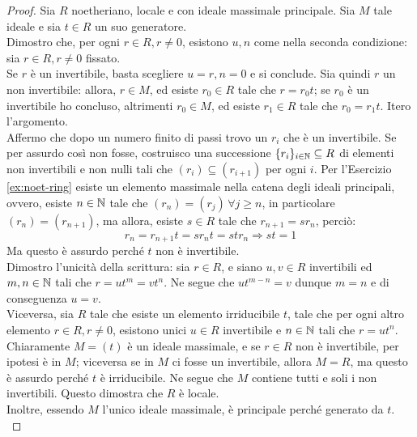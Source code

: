         \begin{proof}
            Sia $R$ noetheriano, locale e con ideale massimale principale. Sia $M$ tale ideale e sia $t \in R$ un suo generatore.\\
            Dimostro che, per ogni $r \in R, r \neq 0$, esistono $u,n$ come nella seconda condizione: sia $r \in R, r \neq 0$ fissato. \\
            Se $r$ è un invertibile, basta scegliere $u = r, n = 0$ e si conclude. Sia quindi $r$ un non invertibile: allora, $r \in M$, ed esiste $r_0 \in R$ 
            tale che $r = r_0t$; se $r_0$ è un invertibile ho concluso, altrimenti $r_0 \in M$, ed esiste $r_1 \in R$ tale che $r_0 = r_1t$. Itero l'argomento. \\
            Affermo che dopo un numero finito di passi trovo un $r_i$ che è un invertibile. Se per assurdo così non fosse, costruisco una successione 
            $\{r_i\}_{i \in \mathbb{N}} \subseteq R$ di elementi non invertibili e non nulli tali che $(r_i) \subseteq (r_{i+1})$ per ogni $i$. Per l'Esercizio \ref{ex:noet-ring} 
            esiste un elemento massimale nella catena degli ideali principali, ovvero, esiste $n \in \mathbb{N}$ tale che $(r_n) = (r_j) \, \forall j \geq n$, in particolare 
            $(r_n) = (r_{n+1})$, ma allora, esiste $s \in R$ tale che $r_{n+1} = sr_n$, perciò: \begin{equation*}
                r_n = r_{n+1}t = sr_nt = str_n \Longrightarrow st = 1
            \end{equation*}
            Ma questo è assurdo perché $t$ non è invertibile.\\
            Dimostro l'unicità della scrittura: sia $r \in R$, e siano $u,v \in R$ invertibili ed $m,n \in \mathbb{N}$ tali che $r = ut^m = vt^n$. Ne segue che $ut^{m-n} = v$ 
            dunque $m = n$ e di conseguenza $u = v$. \\
            Viceversa, sia $R$ tale che esiste un elemento irriducibile $t$, tale che per ogni altro elemento $r \in R, r \neq 0$, esistono unici $u \in R$ invertibile 
            e $n \in \mathbb{N}$ tali che $r = ut^n$. \\
            Chiaramente $M = (t)$ è un ideale massimale, e se $r \in R$ non è invertibile, per ipotesi è in $M$; viceversa se in $M$ ci fosse un invertibile, allora 
            $M = R$, ma questo è assurdo perché $t$ è irriducibile. Ne segue che $M$ contiene tutti e soli i non invertibili. Questo dimostra che $R$ è locale.\\
            Inoltre, essendo $M$ l'unico ideale massimale, è principale perché generato da $t$. \\

\end{proof}
